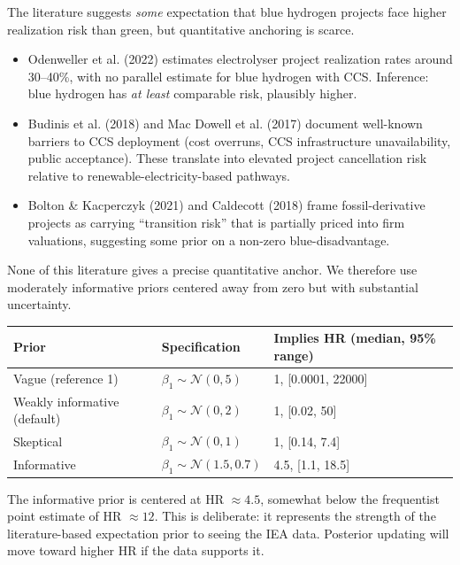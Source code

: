 \documentclass[11pt,a4paper]{article}
\newcommand{\N}{\mathcal{N}}
\begin{document}
\begin{rationale}
The literature suggests \emph{some} expectation that blue hydrogen projects face higher realization risk than green, but quantitative anchoring is scarce.
\begin{itemize}
  \item Odenweller et al. (2022) estimates electrolyser project realization rates around 30--40\%, with no parallel estimate for blue hydrogen with CCS. Inference: blue hydrogen has \emph{at least} comparable risk, plausibly higher.
  \item Budinis et al. (2018) and Mac Dowell et al. (2017) document well-known barriers to CCS deployment (cost overruns, CCS infrastructure unavailability, public acceptance). These translate into elevated project cancellation risk relative to renewable-electricity-based pathways.
  \item Bolton \& Kacperczyk (2021) and Caldecott (2018) frame fossil-derivative projects as carrying ``transition risk'' that is partially priced into firm valuations, suggesting some prior on a non-zero blue-disadvantage.
\end{itemize}
None of this literature gives a precise quantitative anchor. We therefore use moderately informative priors centered away from zero but with substantial uncertainty.
\end{rationale}

\begin{table}[h]
\centering
\begin{tabular}{lll}
\toprule
\textbf{Prior} & \textbf{Specification} & \textbf{Implies HR (median, 95\% range)} \\
\midrule
Vague (reference 1)    & $\beta_1 \sim \N(0, 5)$    & 1, [0.0001, 22000] \\
Weakly informative (default) & $\beta_1 \sim \N(0, 2)$    & 1, [0.02, 50] \\
Skeptical              & $\beta_1 \sim \N(0, 1)$    & 1, [0.14, 7.4] \\
Informative            & $\beta_1 \sim \N(1.5, 0.7)$ & 4.5, [1.1, 18.5] \\
\bottomrule
\end{tabular}
\end{table}

The informative prior is centered at HR $\approx 4.5$, somewhat below the frequentist point estimate of HR $\approx 12$. This is deliberate: it represents the strength of the literature-based expectation prior to seeing the IEA data. Posterior updating will move toward higher HR if the data supports it.
\end{document}
